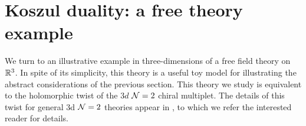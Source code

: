 \documentclass[11pt]{amsart}
\def\brian#1{{\textcolor{blue!65!red}{BRW: {#1}}}}
\def\natalie#1{{\textcolor{green!65!black}{NMP: {#1}}}}
\begin{document}
%
%
%
%
%



\section{Koszul duality: a free theory example}\label{s:free}


We turn to an illustrative example in three-dimensions of a free field theory on $\mathbb R^3$. In spite of its simplicity, this theory is a useful toy model for illustrating the abstract considerations of the previous section. 
This theory we study is equivalent to the holomorphic twist of the $3d$ $\mathcal N=2$ chiral multiplet. The details of this twist for general 3d $\mathcal N=2$ theories appear in \cite{CDG, ACNV, ESW}, to which we refer the interested reader for details. 
\end{document}
